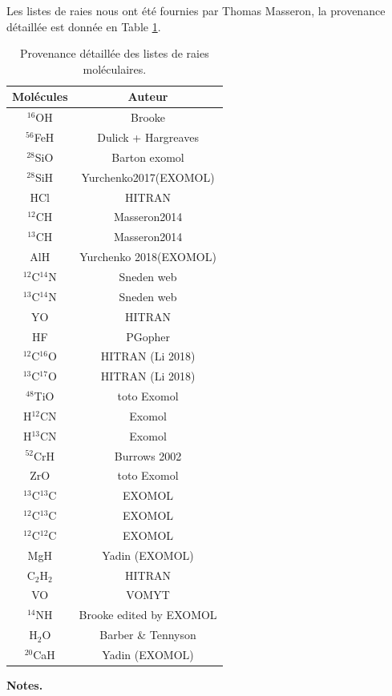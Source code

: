 Les listes de raies nous ont été fournies par Thomas Masseron, la provenance détaillée est donnée en Table \ref{origine_mol}. \par

 \begin{table}[h!]
  \vspace{0.3cm}
 \begin{center}
	\begin{tabular}{cc}
        \hline
		\hline
        Molécules & Auteur \\
        \hline
        $^{16}$OH & Brooke \\
        $^{56}$FeH & Dulick + Hargreaves \\
        $^{28}$SiO & Barton exomol \\
        $^{28}$SiH & Yurchenko2017(EXOMOL) \\
        HCl & HITRAN \\
        $^{12}$CH & Masseron2014 \\
        $^{13}$CH & Masseron2014 \\
        AlH & Yurchenko 2018(EXOMOL) \\
        $^{12}$C$^{14}$N & Sneden web \\
        $^{13}$C$^{14}$N & Sneden web \\
        YO & HITRAN \\
        HF & PGopher \\
        $^{12}$C$^{16}$O & HITRAN (Li 2018) \\
        $^{13}$C$^{17}$O & HITRAN (Li 2018) \\
        $^{48}$TiO & toto Exomol \\
        H$^{12}$CN & Exomol \\
        H$^{13}$CN & Exomol \\
        $^{52}$CrH & Burrows 2002 \\
        ZrO & toto Exomol \\
        $^{13}$C$^{13}$C & EXOMOL\\
        $^{12}$C$^{13}$C & EXOMOL\\
        $^{12}$C$^{12}$C & EXOMOL\\
        MgH & Yadin (EXOMOL) \\
        C$_2$H$_2$ & HITRAN \\
        VO & VOMYT \\
        $^{14}$NH &  Brooke edited by EXOMOL \\
        H$_2$O & Barber \& Tennyson \\
        $^{20}$CaH & Yadin (EXOMOL) \\
    \end{tabular}
\end{center} 
\caption{Provenance détaillée des listes de raies moléculaires.}
\label{origine_mol}
\textbf{Notes.}
\end{table}


